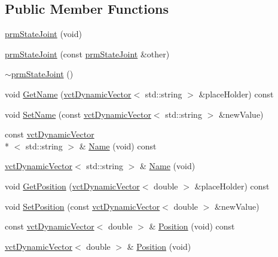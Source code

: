 \subsection*{Public Member Functions}
\begin{DoxyCompactItemize}
\item 
\hyperlink{classprm_state_joint_a8692a6dcd628639db1e4c17bfbe14b58}{prm\-State\-Joint} (void)
\item 
\hyperlink{classprm_state_joint_a617147f7adafb5ee8ac2e64116d9f06f}{prm\-State\-Joint} (const \hyperlink{classprm_state_joint}{prm\-State\-Joint} \&other)
\item 
\hyperlink{classprm_state_joint_a53dce08321862d0d3668b00c66846aa7}{$\sim$prm\-State\-Joint} ()
\item 
void \hyperlink{classprm_state_joint_a3ddac6ab8d93f7594a08072033640ab7}{Get\-Name} (\hyperlink{classvct_dynamic_vector}{vct\-Dynamic\-Vector}$<$ std\-::string $>$ \&place\-Holder) const 
\item 
void \hyperlink{classprm_state_joint_af4fbaf13324e76c083af43271945a903}{Set\-Name} (const \hyperlink{classvct_dynamic_vector}{vct\-Dynamic\-Vector}$<$ std\-::string $>$ \&new\-Value)
\item 
const \hyperlink{classvct_dynamic_vector}{vct\-Dynamic\-Vector}\\*
$<$ std\-::string $>$ \& \hyperlink{classprm_state_joint_a435ce0bdf96bb30da4bd6c792572fdcf}{Name} (void) const 
\item 
\hyperlink{classvct_dynamic_vector}{vct\-Dynamic\-Vector}$<$ std\-::string $>$ \& \hyperlink{classprm_state_joint_acc57ce04af58162cd42499af80c0748f}{Name} (void)
\item 
void \hyperlink{classprm_state_joint_aeff6ad8688b840213b7b83335a6ee8d7}{Get\-Position} (\hyperlink{classvct_dynamic_vector}{vct\-Dynamic\-Vector}$<$ double $>$ \&place\-Holder) const 
\item 
void \hyperlink{classprm_state_joint_a61d7a49853bc50df8af8d45fbcb0729c}{Set\-Position} (const \hyperlink{classvct_dynamic_vector}{vct\-Dynamic\-Vector}$<$ double $>$ \&new\-Value)
\item 
const \hyperlink{classvct_dynamic_vector}{vct\-Dynamic\-Vector}$<$ double $>$ \& \hyperlink{classprm_state_joint_a807ce0a9b74f701bfa85210d1f842b7f}{Position} (void) const 
\item 
\hyperlink{classvct_dynamic_vector}{vct\-Dynamic\-Vector}$<$ double $>$ \& \hyperlink{classprm_state_joint_a44ce263d2c0d215cec5126efe043baa0}{Position} (void)
\item 

\end{DoxyCompactItemize}
